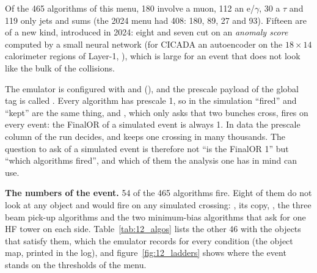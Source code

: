 Of the 465 algorithms of this menu, 180 involve a muon, 112 an e/$\gamma$, 30 a $\tau$ and 119 only jets and sums
(the 2024 menu had 408: 180, 89, 27 and 93). Fifteen are of a new kind, introduced in 2024: eight
 and seven  cut on an \emph{anomaly score}
computed by a small neural network (for CICADA an autoencoder on the $18\times14$ calorimeter regions of Layer-1,
), which is large for an event that does not look like the bulk of the collisions.

\begin{plainwords}
The emulator is configured with  and  (), and the prescale payload of the global tag is
called . Every algorithm has prescale 1, so in the simulation ``fired''
and ``kept'' are the same thing, and , which only asks that two bunches cross, fires on every
event: the FinalOR of a simulated event is always 1. In data the prescale column of the run decides, and
 keeps one crossing in many thousands. The question to ask of a simulated event is therefore not
``is the FinalOR 1'' but ``which algorithms fired'', and which of them the analysis one has in mind can use.
\end{plainwords}

\textbf{The numbers of the event.} 54 of the 465 algorithms fire. Eight of them do not look at any object and
would fire on any simulated crossing: , its copy, , the three beam pick-up
algorithms and the two minimum-bias algorithms that ask for one HF tower on each side. Table~\ref{tab:12_algos}
lists the other 46 with the objects that satisfy them, which the emulator records for every condition (the object
map, printed in the log), and figure~\ref{fig:12_ladders} shows where the event stands on the thresholds of the
menu.


